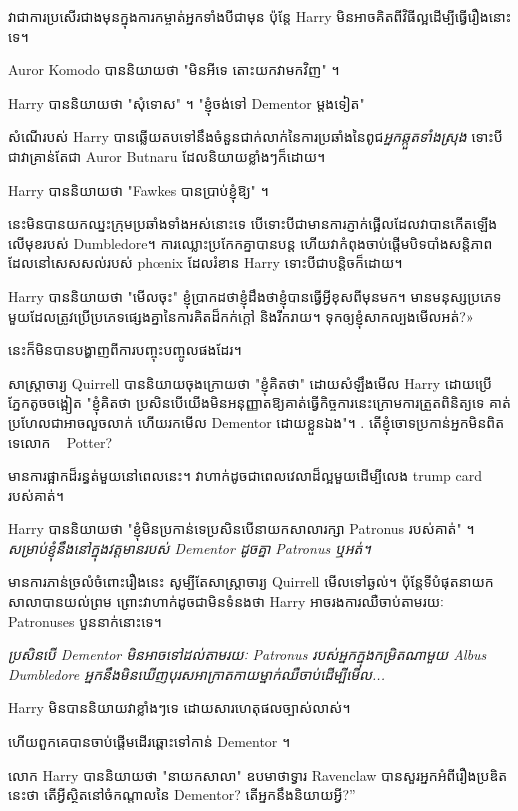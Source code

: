 {វាជាការប្រសើរជាងមុនក្នុងការកម្ចាត់អ្នកទាំងបីជាមុន ប៉ុន្តែ Harry មិនអាចគិតពីវិធីល្អដើម្បីធ្វើរឿងនោះទេ។

Auror Komodo បាននិយាយថា "មិនអីទេ តោះយកវាមកវិញ" ។

Harry បាននិយាយថា "សុំទោស" ។ "ខ្ញុំចង់ទៅ Dementor ម្តងទៀត"

\later

សំណើរបស់ Harry បានឆ្លើយតបទៅនឹងចំនួនជាក់លាក់នៃការប្រឆាំងនៃពូជ\emph{អ្នកឆ្កួតទាំងស្រុង} ទោះបីជាវាគ្រាន់តែជា Auror Butnaru ដែលនិយាយខ្លាំងៗក៏ដោយ។

Harry បាននិយាយថា "Fawkes បានប្រាប់ខ្ញុំឱ្យ" ។

នេះ​មិន​បាន​យក​ឈ្នះ​ក្រុម​ប្រឆាំង​ទាំង​អស់​នោះ​ទេ បើ​ទោះ​បី​ជា​មាន​ការ​ភ្ញាក់ផ្អើល​ដែល​វា​បាន​កើត​ឡើង​លើ​មុខ​របស់ Dumbledore។ ការឈ្លោះប្រកែកគ្នាបានបន្ត ហើយវាកំពុងចាប់ផ្តើមបិទបាំងសន្តិភាពដែលនៅសេសសល់របស់ phœnix ដែលរំខាន Harry ទោះបីជាបន្តិចក៏ដោយ។

Harry បាននិយាយថា "មើលចុះ" ខ្ញុំប្រាកដថាខ្ញុំដឹងថាខ្ញុំបានធ្វើអ្វីខុសពីមុនមក។ មាន​មនុស្ស​ប្រភេទ​មួយ​ដែល​ត្រូវ​ប្រើ​ប្រភេទ​ផ្សេង​គ្នា​នៃ​ការ​គិត​ដ៏​កក់ក្ដៅ និង​រីករាយ។ ទុក​ឲ្យ​ខ្ញុំ​សាក​ល្បង​មើល​អត់?»

នេះក៏មិនបានបង្ហាញពីការបញ្ចុះបញ្ចូលផងដែរ។

សាស្ត្រាចារ្យ Quirrell បាននិយាយចុងក្រោយថា "ខ្ញុំគិតថា" ដោយសំឡឹងមើល Harry ដោយប្រើភ្នែកតូចចង្អៀត "ខ្ញុំគិតថា ប្រសិនបើយើងមិនអនុញ្ញាតឱ្យគាត់ធ្វើកិច្ចការនេះក្រោមការត្រួតពិនិត្យទេ គាត់ប្រហែលជាអាចលួចលាក់ ហើយរកមើល Dementor ដោយខ្លួនឯង"។ . តើ​ខ្ញុំ​ចោទ​ប្រកាន់​អ្នក​មិន​ពិត​ទេ​លោក ~ Potter?

មាន​ការ​ផ្អាក​ដ៏​រន្ធត់​មួយ​នៅ​ពេល​នេះ។ វាហាក់ដូចជាពេលវេលាដ៏ល្អមួយដើម្បីលេង trump card របស់គាត់។

Harry បាននិយាយថា "ខ្ញុំមិនប្រកាន់ទេប្រសិនបើនាយកសាលារក្សា Patronus របស់គាត់" ។ \emph{សម្រាប់​ខ្ញុំ​នឹង​នៅ​ក្នុង​វត្តមាន​របស់ Dementor ដូច​គ្នា Patronus ឬ​អត់។}

មានការភាន់ច្រលំចំពោះរឿងនេះ សូម្បីតែសាស្រ្តាចារ្យ Quirrell មើលទៅឆ្ងល់។ ប៉ុន្តែទីបំផុតនាយកសាលាបានយល់ព្រម ព្រោះវាហាក់ដូចជាមិនទំនងថា Harry អាចរងការឈឺចាប់តាមរយៈ Patronuses បួននាក់នោះទេ។

\emph{ប្រសិនបើ Dementor មិនអាចទៅដល់តាមរយៈ Patronus របស់អ្នកក្នុងកម្រិតណាមួយ Albus Dumbledore អ្នកនឹងមិនឃើញបុរសអាក្រាតកាយម្នាក់ឈឺចាប់ដើម្បីមើល...}

Harry មិនបាននិយាយវាខ្លាំងៗទេ ដោយសារហេតុផលច្បាស់លាស់។

ហើយ​ពួក​គេ​បាន​ចាប់​ផ្តើម​ដើរ​ឆ្ពោះ​ទៅ​កាន់ Dementor ។

លោក Harry បាននិយាយថា "នាយកសាលា" ឧបមាថាទ្វារ Ravenclaw បានសួរអ្នកអំពីរឿងប្រឌិតនេះថា តើអ្វីស្ថិតនៅចំកណ្តាលនៃ Dementor? តើអ្នកនឹងនិយាយអ្វី?”

}
